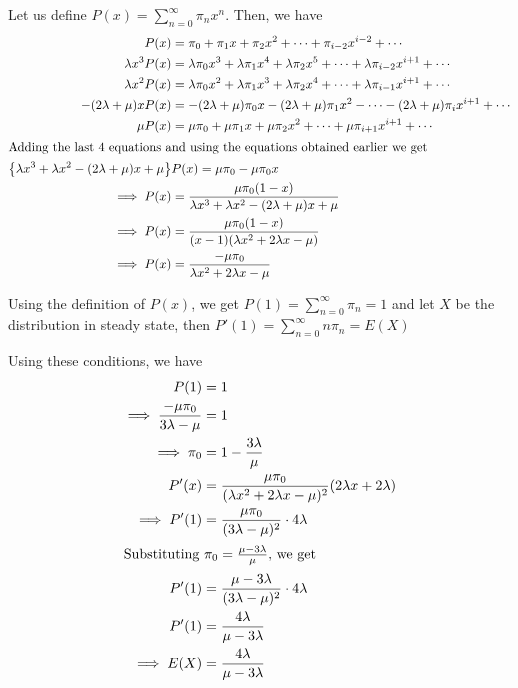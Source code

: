\documentclass[12pt, oneside]{article}
\begin{document}
\begin{enumerate}
{    Let us define \(P(x) = \sum_{n = 0}^{\infty} \pi_n x^n\). Then, we have
    \begin{align*}
        P(x) &= \pi_0 + \pi_1 x + \pi_2 x^2 + \cdots + \pi_{i-2}x^{i-2} + \cdots \\
        \lambda x^3 P(x) &= \lambda \pi_0 x^3  + \lambda \pi_1 x^4 + \lambda \pi_2 x^5+ \cdots + \lambda\pi_{i-2}x^{i+1} + \cdots \\
        \lambda x^2 P(x) &= \lambda \pi_0 x^2 + \lambda \pi_1 x^3 + \lambda \pi_2 x^4 + \cdots + \lambda\pi_{i-1}x^{i+1} + \cdots \\
        -(2\lambda + \mu)x P(x) &= -(2\lambda + \mu) \pi_0 x -(2\lambda + \mu) \pi_1 x^2 - \cdots
                                   -(2\lambda + \mu)\pi_{i}x^{i+1} + \cdots \\
        \mu P(x) &= \mu\pi_0 + \mu\pi_1 x + \mu\pi_2 x^2 + \cdots + \mu\pi_{i+1}x^{i+1} + \cdots \\
        \intertext{Adding the last 4 equations and using the equations obtained earlier we get}
        \left\{\lambda x^3 + \lambda x^2 - (2\lambda + \mu)x + \mu\right\}&P(x) = \mu \pi_0 - \mu \pi_0 x \\
        \implies P(x) &= \frac{\mu \pi_0 (1 - x)}{\lambda x^3 + \lambda x^2 - (2\lambda + \mu)x + \mu} \\
        \implies P(x) &= \frac{\mu \pi_0 (1 - x)}{(x - 1)(\lambda x^2 + 2 \lambda x - \mu)} \\
        \implies P(x) &= \frac{-\mu \pi_0 }{\lambda x^2 + 2 \lambda x - \mu}
    \end{align*}

    Using the definition of \(P(x)\), we get \(P(1) = \sum_{n = 0}^{\infty} \pi_n = 1\) and 
    let \(X\) be the distribution in steady state, then \(P'(1) = \sum_{n = 0}^{\infty} n \pi_n = E(X)\) 

    Using these conditions, we have 
    \begin{align*}
        P(1) &= 1 \\
        \implies \frac{-\mu \pi_0 }{3 \lambda - \mu} &= 1 \\
        \implies \pi_0 &= 1 - \frac{3 \lambda}{\mu} \\
        P'(x) &= \frac{\mu \pi_0}{(\lambda x^2 + 2 \lambda x - \mu)^2} (2 \lambda x + 2 \lambda) \\
        \implies P'(1) &= \frac{\mu \pi_0}{(3\lambda - \mu)^2} \cdot 4\lambda \\
        \intertext{Substituting \(\pi_0 = \frac{\mu - 3\lambda}{\mu}\), we get}
        P'(1) &= \frac{\mu - 3\lambda}{(3\lambda - \mu)^2} \cdot 4\lambda \\
        P'(1) &= \frac{4\lambda}{\mu - 3\lambda} \\
        \implies E(X) &= \frac{4\lambda}{\mu - 3\lambda}
    \end{align*}

}
\end{enumerate}
\end{document}
